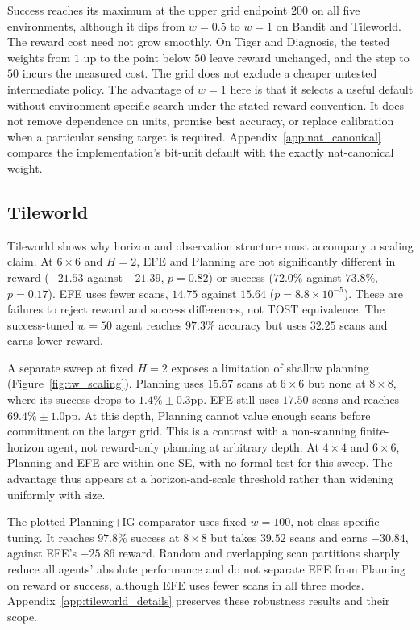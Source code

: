 \documentclass[manuscript, screen, review]{jair}
\begin{document}
Success reaches its maximum at the upper grid endpoint $200$ on all five environments, although it dips from $w{=}0.5$ to $w{=}1$ on Bandit and Tileworld. The reward cost need not grow smoothly. On Tiger and Diagnosis, the tested weights from $1$ up to the point below $50$ leave reward unchanged, and the step to $50$ incurs the measured cost. The grid does not exclude a cheaper untested intermediate policy. The advantage of $w{=}1$ here is that it selects a useful default without environment-specific search under the stated reward convention. It does not remove dependence on units, promise best accuracy, or replace calibration when a particular sensing target is required. Appendix~\ref{app:nat_canonical} compares the implementation's bit-unit default with the exactly nat-canonical weight.

\subsection{Tileworld}
\label{sec:tileworld}

Tileworld shows why horizon and observation structure must accompany a scaling claim. At $6{\times}6$ and $H{=}2$, EFE and Planning are not significantly different in reward ($-21.53$ against $-21.39$, $p=0.82$) or success ($72.0\%$ against $73.8\%$, $p=0.17$). EFE uses fewer scans, $14.75$ against $15.64$ ($p=8.8{\times}10^{-5}$). These are failures to reject reward and success differences, not TOST equivalence. The success-tuned $w{=}50$ agent reaches $97.3\%$ accuracy but uses $32.25$ scans and earns lower reward.

A separate sweep at fixed $H{=}2$ exposes a limitation of shallow planning (Figure~\ref{fig:tw_scaling}). Planning uses $15.57$ scans at $6{\times}6$ but none at $8{\times}8$, where its success drops to $1.4\%\pm0.3$pp. EFE still uses $17.50$ scans and reaches $69.4\%\pm1.0$pp. At this depth, Planning cannot value enough scans before commitment on the larger grid. This is a contrast with a non-scanning finite-horizon agent, not reward-only planning at arbitrary depth. At $4{\times}4$ and $6{\times}6$, Planning and EFE are within one SE, with no formal test for this sweep. The advantage thus appears at a horizon-and-scale threshold rather than widening uniformly with size.

The plotted Planning+IG comparator uses fixed $w{=}100$, not class-specific tuning. It reaches $97.8\%$ success at $8{\times}8$ but takes $39.52$ scans and earns $-30.84$, against EFE's $-25.86$ reward. Random and overlapping scan partitions sharply reduce all agents' absolute performance and do not separate EFE from Planning on reward or success, although EFE uses fewer scans in all three modes. Appendix~\ref{app:tileworld_details} preserves these robustness results and their scope.
\end{document}
